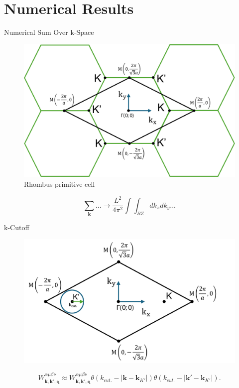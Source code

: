 \documentclass{beamer}
\begin{document}
\section{Numerical Results}
	\begin{frame}{Numerical Sum Over k-Space}
		\begin{figure}
\includegraphics[width=0.5\linewidth]{images/Rhombus.pdf}
\caption{Rhombus primitive cell}
\end{figure}
		\begin{equation}
			\sum_{\textbf{k}} ... \to \frac{L^2}{4\pi^2} \int \int_{BZ} dk_x dk_y...
		\end{equation}
	\end{frame}
	\begin{frame}{k-Cutoff}
	\begin{figure}
		\includegraphics[width=0.75\linewidth]{images/kcutoff.pdf}
	\end{figure}
	\begin{equation}
		W^{\alpha \mu \beta \nu}_{\textbf{k},\textbf{k}',\textbf{q}} \approx W^{\alpha \mu \beta \nu}_{\textbf{k},\textbf{k}',\textbf{q}} \theta(k_{cut.} - |\textbf{k} - \textbf{k}_{K'}|) \theta(k_{cut.} - |\textbf{k}' - \textbf{k}_{K'}|).
	\end{equation}
	\end{frame}
\end{document}

